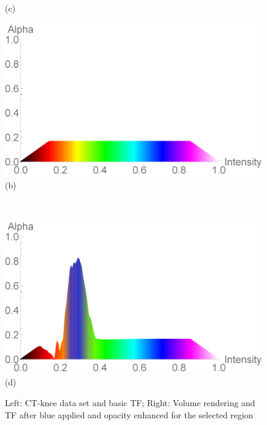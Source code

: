 \documentclass[twoside,twocolumn,10pt]{article}
\begin{document}
\begin{figure}
\begin{minipage}{.2\textwidth}
(c)
		\label{fig:CT-Knee_blue}
	\end{minipage}
	\begin{minipage}{.24\textwidth}
		\centering
		\includegraphics[width=1\linewidth]{tf_CT-Knee}
		(b)
		\label{fig:tf_CT-Knee}
	\end{minipage}~
	\begin{minipage}{.24\textwidth}
		\centering
		\includegraphics[width=1\linewidth]{tf_CT-Knee_blue}
(d)
		\label{fig:tf_CT-Knee_blue}
	\end{minipage}
	\caption{Left: CT-knee data set and basic TF; Right: Volume rendering and TF after blue applied and opacity enhanced for the selected region}
	\label{fig:CT-knee_all}
	
\end{figure}
\end{document}
